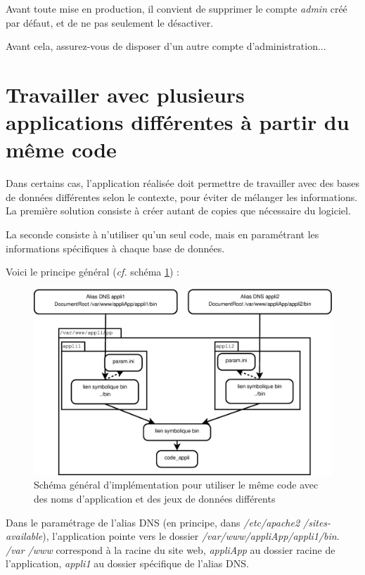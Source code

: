 Avant toute mise en production, il convient de supprimer le compte \textit{admin} créé par défaut, et de ne pas seulement le désactiver. 

Avant cela, assurez-vous de disposer d'un autre compte d'administration...

\section{Travailler avec plusieurs applications différentes à partir du même code}\label{dnsmultiple}

Dans certains cas, l'application réalisée doit permettre de travailler avec des bases de données différentes selon le contexte, pour éviter de mélanger les informations. La première solution consiste à créer autant de copies que nécessaire du logiciel.

La seconde consiste à n'utiliser qu'un seul code, mais en paramétrant les informations spécifiques à chaque base de données.

Voici le principe général (\textit{cf.} schéma \ref{dnsmultipleschema})  :
\begin{figure}[th]
\label{dnsmultipleschema}
\includegraphics[width=\linewidth]{dessin/dnsmultiple}
\caption{Schéma général d'implémentation pour utiliser le même code avec des noms d'application et des jeux de données différents}
\end{figure}

Dans le paramétrage de l'alias DNS (en principe, dans \textit{/etc/apache2 /sites-available}), l'application pointe vers le dossier \textit{/var/www/appliApp/appli1/bin}. 
\textit{/var /www} correspond à la racine du site web, \textit{appliApp} au dossier racine de l'application, \textit{appli1} au dossier spécifique de l'alias DNS.


